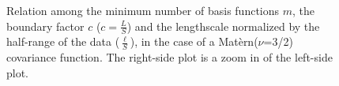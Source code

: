 \documentclass[onecolumn,a4paper,11pt]{article}
\begin{document}
\begin{figure}
\centering
{}
\hspace{3mm}
\caption{Relation among the minimum number of basis functions $m$, the boundary factor $c$ \hspace{0.1mm} ($c = \frac{L}{S}$) \hspace{0.1mm} and the lengthscale normalized by the half-range of the data ($\frac{\ell}{S}$), in the case of a Mat\`ern($\nu$=3/2) covariance function. The right-side plot is a zoom in of the left-side plot.}
  \label{fig6_lscale_vs_J_vs_c_Matern}
\end{figure}
\end{document}
